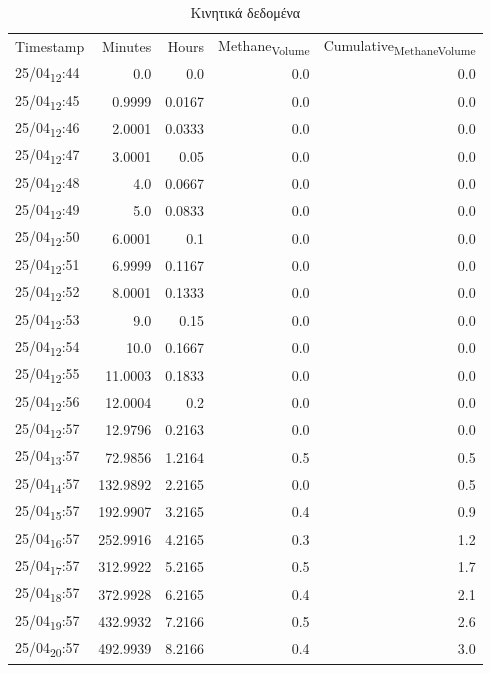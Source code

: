 \documentclass[11pt]{article}
\begin{document}
\begin{table}[htbp]
\caption{Κινητικά δεδομένα}
\centering
\begin{tabular}{lrrrr}
Timestamp & Minutes & Hours & Methane\textsubscript{Volume} & Cumulative\textsubscript{Methane}\textsubscript{Volume}\\[0pt]
25/04\textsubscript{12}:44 & 0.0 & 0.0 & 0.0 & 0.0\\[0pt]
25/04\textsubscript{12}:45 & 0.9999 & 0.0167 & 0.0 & 0.0\\[0pt]
25/04\textsubscript{12}:46 & 2.0001 & 0.0333 & 0.0 & 0.0\\[0pt]
25/04\textsubscript{12}:47 & 3.0001 & 0.05 & 0.0 & 0.0\\[0pt]
25/04\textsubscript{12}:48 & 4.0 & 0.0667 & 0.0 & 0.0\\[0pt]
25/04\textsubscript{12}:49 & 5.0 & 0.0833 & 0.0 & 0.0\\[0pt]
25/04\textsubscript{12}:50 & 6.0001 & 0.1 & 0.0 & 0.0\\[0pt]
25/04\textsubscript{12}:51 & 6.9999 & 0.1167 & 0.0 & 0.0\\[0pt]
25/04\textsubscript{12}:52 & 8.0001 & 0.1333 & 0.0 & 0.0\\[0pt]
25/04\textsubscript{12}:53 & 9.0 & 0.15 & 0.0 & 0.0\\[0pt]
25/04\textsubscript{12}:54 & 10.0 & 0.1667 & 0.0 & 0.0\\[0pt]
25/04\textsubscript{12}:55 & 11.0003 & 0.1833 & 0.0 & 0.0\\[0pt]
25/04\textsubscript{12}:56 & 12.0004 & 0.2 & 0.0 & 0.0\\[0pt]
25/04\textsubscript{12}:57 & 12.9796 & 0.2163 & 0.0 & 0.0\\[0pt]
25/04\textsubscript{13}:57 & 72.9856 & 1.2164 & 0.5 & 0.5\\[0pt]
25/04\textsubscript{14}:57 & 132.9892 & 2.2165 & 0.0 & 0.5\\[0pt]
25/04\textsubscript{15}:57 & 192.9907 & 3.2165 & 0.4 & 0.9\\[0pt]
25/04\textsubscript{16}:57 & 252.9916 & 4.2165 & 0.3 & 1.2\\[0pt]
25/04\textsubscript{17}:57 & 312.9922 & 5.2165 & 0.5 & 1.7\\[0pt]
25/04\textsubscript{18}:57 & 372.9928 & 6.2165 & 0.4 & 2.1\\[0pt]
25/04\textsubscript{19}:57 & 432.9932 & 7.2166 & 0.5 & 2.6\\[0pt]
25/04\textsubscript{20}:57 & 492.9939 & 8.2166 & 0.4 & 3.0\\[0pt]

\end{tabular}
\end{table}
\end{document}
